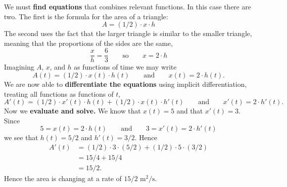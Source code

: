 \documentclass{ximera}
\begin{document}
\begin{example}
\begin{explanation}
    We must \textbf{find equations} that combines relevant
    functions. In this case there are two. The first is the formula
    for the area of a triangle:
    \[
    A = (1/2) \cdot x \cdot h
    \]
    The second uses the fact that the larger triangle is similar to
    the smaller triangle, meaning that the proportions of the sides
    are the same,
    \[
    \frac{x}{h} = \frac{6}{3}\qquad\text{so}\qquad x = 2\cdot h
    \]
    Imagining $A$, $x$, and $h$ as functions of time we may write
    \[
    A(t) = (1/2) \cdot x(t) \cdot h(t) \qquad\text{and}\qquad x(t) =
    2\cdot h(t).
    \]
    We are now able to \textbf{differentiate the equations} using
    implicit differentiation, treating all functions as functions of
    $t$,
    \[
    A'(t) = (1/2) \cdot x'(t) \cdot h(t) +  (1/2) \cdot x(t) \cdot h'(t)\qquad\text{and}\qquad x'(t) = 2\cdot h'(t).
    \]
    Now we \textbf{evaluate and solve.} We
    know that $x(t) = 5$ and that $x'(t) = 3$. Since
    \[
    5=x(t) = 2\cdot h(t)\qquad\text{and}\qquad 3=x'(t)= 2\cdot h'(t)
    \]
    we see that $h(t) = 5/2$ and $h'(t) = 3/2$. Hence
    \begin{align*}
      A'(t) &= (1/2) \cdot 3 \cdot (5/2) + (1/2) \cdot 5 \cdot (3/2)\\
      &= 15/4 + 15/4\\
      &= 15/2.
    \end{align*}
    Hence the area is changing at a rate of $15/2$
    $\text{m}^2/\text{s}$.
  \end{explanation}
\end{example}
\end{document}
